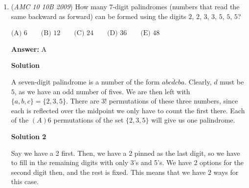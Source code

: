\begin{enumerate}
 



\textbf{Solution 3}

Let $AB$ represent the flagpole in the diagram above. After the flagpole breaks at point $D$, its tip lies at point $C$. Since none of the flagpole is destroyed, we know that $DA=DC$. Therefore, triangle $\triangle ADC$ is isosceles.

 Draw the altitude $DE \perp AC$. Since $\triangle ADC$ is isosceles, we know that $AE = EC$. Also note that $\triangle AED \sim \triangle ABC$. Therefore,
 \begin{align*} AD &= AE \times \frac{AD}{AE} \\ &= \frac{AC}{2} \times \frac{AC}{AB} \\ &= \frac{AC^2}{2 AB} \\ &= \frac{AB^2 + BC^2}{2 AB} \end{align*}


 Since $AB = 5$ and $BC = 1$, we have that $AD = \frac{5^2 + 1^2}{2 \cdot 5} = 2.6$, and thus $x = AB - AD = \boxed{2.4}$.

 There is currently no video solution on Youtube. A wrong link was posted here.

 (I sent a request to BeautyofMath so there may be one on his channel soon)

 


	\item (\textit{AMC 10 10B 2009}) How many $7$-digit palindromes (numbers that read the same backward as forward) can be formed using the digits $2$, $2$, $3$, $3$, $5$, $5$, $5$?


 $\text{(A) } 6 \qquad \text{(B) } 12 \qquad \text{(C) } 24 \qquad \text{(D) } 36 \qquad \text{(E) } 48$

 \textbf{Answer: }A



\textbf{Solution}

A seven-digit palindrome is a number of the form $\overline{abcdcba}$. Clearly, $d$ must be $5$, as we have an odd number of fives. We are then left with $\{a,b,c\} = \{2,3,5\}$. There are $3!$ permutations of these three numbers, since each is reflected over the midpoint we only have to count the first there. Each of the $\boxed{(A)6}$ permutations of the set $\{2,3,5\}$ will give us one palindrome.

 



\textbf{Solution 2}

Say we have a 2 first. Then, we have a 2 pinned as the last digit, so we have to fill in the remaining digits with only 3's and 5's. We have 2 options for the second digit then, and the rest is fixed. This means that we have $2$ ways for this case.


\end{enumerate}
